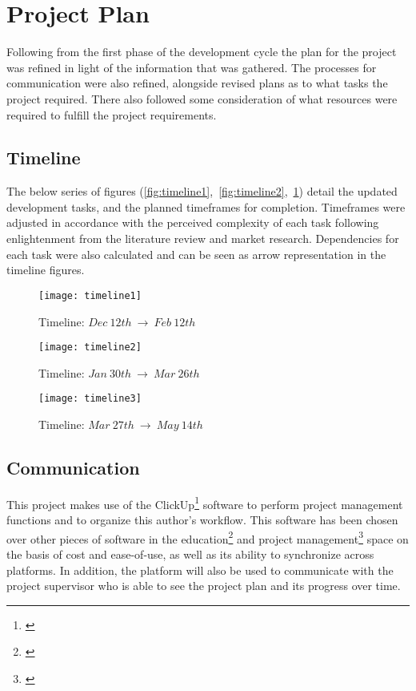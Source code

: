 
\thispagestyle{plain}
\newpage
\section{Project Plan}\label{sec:project-plan}

\normalsize

Following from the first phase of the development cycle the plan for the project was refined in light of the information that was gathered.
The processes for communication were also refined, alongside revised plans as to what tasks the project required.
There also followed some consideration of what resources were required to fulfill the project requirements.

\subsection{Timeline}\label{subsec:timeline}

The below series of figures (\ref{fig:timeline1},~\ref{fig:timeline2},~\ref{fig:timeline3}) detail the updated development tasks, and the planned timeframes for completion.
Timeframes were adjusted in accordance with the perceived complexity of each task following enlightenment from the literature review and market research.
Dependencies for each task were also calculated and can be seen as arrow representation in the timeline figures.

\begin{figure}[!htb]
    \minipage{\textwidth}
    \texttt{[image: timeline1]}
    \caption{Timeline: $Dec~12th~\rightarrow~Feb~12th$}\label{fig:timeline1}
    \endminipage\hfill
    \minipage{\textwidth}
    \texttt{[image: timeline2]}
    \caption{Timeline: $Jan~30th~\rightarrow~Mar~26th$}\label{fig:timeline2}
    \endminipage\hfill
    \minipage{\textwidth}
    \texttt{[image: timeline3]}
    \caption{Timeline: $Mar~27th~\rightarrow~May~14th$}\label{fig:timeline3}
    \endminipage
\end{figure}

\subsection{Communication}\label{subsec:communication}

This project makes use of the ClickUp\footnote{\citep{clickup}} software to perform project management functions and to organize this author’s workflow.
This software has been chosen over other pieces of software in the education\footnote{\citep{education_software}} and project management\footnote{\citep{pm_software}} space on the basis of cost and ease-of-use, as well as its ability to synchronize across platforms.
In addition, the platform will also be used to communicate with the project supervisor who is able to see the project plan and its progress over time.

